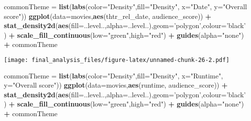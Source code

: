 \documentclass[]{article}
\newenvironment{Shaded}{\begin{snugshade}}{\end{snugshade}}
\newcommand{\KeywordTok}[1]{\textcolor[rgb]{0.13,0.29,0.53}{\textbf{#1}}}
\newcommand{\DataTypeTok}[1]{\textcolor[rgb]{0.13,0.29,0.53}{#1}}
\newcommand{\StringTok}[1]{\textcolor[rgb]{0.31,0.60,0.02}{#1}}
\newcommand{\OperatorTok}[1]{\textcolor[rgb]{0.81,0.36,0.00}{\textbf{#1}}}
\newcommand{\NormalTok}[1]{#1}
\begin{document}
\begin{Shaded}
\begin{Highlighting}[]
\NormalTok{commonTheme =}\StringTok{ }\KeywordTok{list}\NormalTok{(}\KeywordTok{labs}\NormalTok{(}\DataTypeTok{color=}\StringTok{"Density"}\NormalTok{,}\DataTypeTok{fill=}\StringTok{"Density"}\NormalTok{, }\DataTypeTok{x=}\StringTok{"Date"}\NormalTok{, }\DataTypeTok{y=}\StringTok{"Overall score"}\NormalTok{))}
\KeywordTok{ggplot}\NormalTok{(}\DataTypeTok{data=}\NormalTok{movies,}\KeywordTok{aes}\NormalTok{(thtr_rel_date, audience_score)) }\OperatorTok{+}\StringTok{ }
\StringTok{  }\KeywordTok{stat_density2d}\NormalTok{(}\KeywordTok{aes}\NormalTok{(}\DataTypeTok{fill=}\NormalTok{..level..,}\DataTypeTok{alpha=}\NormalTok{..level..),}\DataTypeTok{geom=}\StringTok{'polygon'}\NormalTok{,}\DataTypeTok{colour=}\StringTok{'black'}\NormalTok{) }\OperatorTok{+}\StringTok{ }
\StringTok{  }\KeywordTok{scale_fill_continuous}\NormalTok{(}\DataTypeTok{low=}\StringTok{"green"}\NormalTok{,}\DataTypeTok{high=}\StringTok{"red"}\NormalTok{) }\OperatorTok{+}
\StringTok{  }\KeywordTok{guides}\NormalTok{(}\DataTypeTok{alpha=}\StringTok{"none"}\NormalTok{) }\OperatorTok{+}
\StringTok{  }\NormalTok{commonTheme}
\end{Highlighting}
\end{Shaded}

\texttt{[image: final\_analysis\_files/figure-latex/unnamed-chunk-26-2.pdf]}

\begin{Shaded}
\begin{Highlighting}[]
\NormalTok{commonTheme =}\StringTok{ }\KeywordTok{list}\NormalTok{(}\KeywordTok{labs}\NormalTok{(}\DataTypeTok{color=}\StringTok{"Density"}\NormalTok{,}\DataTypeTok{fill=}\StringTok{"Density"}\NormalTok{, }\DataTypeTok{x=}\StringTok{"Runtime"}\NormalTok{, }\DataTypeTok{y=}\StringTok{"Overall score"}\NormalTok{))}
\KeywordTok{ggplot}\NormalTok{(}\DataTypeTok{data=}\NormalTok{movies,}\KeywordTok{aes}\NormalTok{(runtime, audience_score)) }\OperatorTok{+}\StringTok{ }
\StringTok{  }\KeywordTok{stat_density2d}\NormalTok{(}\KeywordTok{aes}\NormalTok{(}\DataTypeTok{fill=}\NormalTok{..level..,}\DataTypeTok{alpha=}\NormalTok{..level..),}\DataTypeTok{geom=}\StringTok{'polygon'}\NormalTok{,}\DataTypeTok{colour=}\StringTok{'black'}\NormalTok{) }\OperatorTok{+}\StringTok{ }
\StringTok{  }\KeywordTok{scale_fill_continuous}\NormalTok{(}\DataTypeTok{low=}\StringTok{"green"}\NormalTok{,}\DataTypeTok{high=}\StringTok{"red"}\NormalTok{) }\OperatorTok{+}
\StringTok{  }\KeywordTok{guides}\NormalTok{(}\DataTypeTok{alpha=}\StringTok{"none"}\NormalTok{) }\OperatorTok{+}
\StringTok{   }\NormalTok{commonTheme}
\end{Highlighting}
\end{Shaded}
\end{document}
